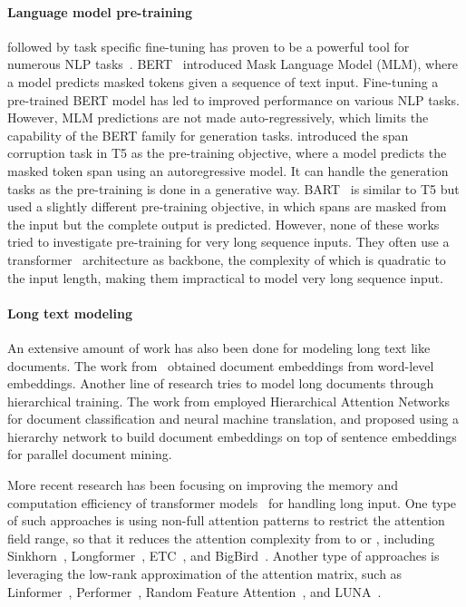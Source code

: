\documentclass[11pt]{article}
\begin{document}
\paragraph{Language model pre-training} 
followed by task specific fine-tuning has proven to be a powerful tool for numerous NLP tasks~\cite{devlin-etal-2019-bert,liu2019roberta,zhang-etal-2019-ernie,Radford2019LanguageMA,t5,lewis-etal-2020-bart,joshi-etal-2020-spanbert}.
BERT~\cite{devlin-etal-2019-bert} introduced Mask Language Model (MLM), where a model predicts masked tokens given a sequence of text input. Fine-tuning a pre-trained BERT model has led to improved performance on various NLP tasks.
However, MLM predictions are not made auto-regressively, which limits the capability of the BERT family for generation tasks.
\citet{t5} introduced the span corruption task in T5 as the pre-training objective, where a model predicts the masked token span using an autoregressive model.
It can handle the generation tasks as the pre-training is done in a generative way.
BART~\cite{lewis-etal-2020-bart} is similar to T5 but used a slightly different pre-training objective, in which spans are masked from the input but the complete output is predicted. 
However, none of these works tried to investigate pre-training for very long sequence inputs.
They often use a transformer~\cite{transformer} architecture as backbone, the complexity of which is quadratic to the input length, making them impractical to model very long sequence input.



\paragraph{Long text modeling}
An extensive amount of work has also been done for modeling long text like documents. The work from~\citet{roy2016,chen2017,wu2018} obtained document embeddings from word-level embeddings. Another line of research tries to model long documents through hierarchical training. The work from \citet{yang-etal-2016-hierarchical,miculicich-etal-2018-document} employed Hierarchical Attention Networks for document classification and neural machine translation, and \citet{guo-etal-2019-hierarchical} proposed using a hierarchy network to build document embeddings on top of sentence embeddings for parallel document mining. 

More recent research has been focusing on improving the memory and computation efficiency of transformer models~\cite{Tay2020EfficientTA,tay2021long} for handling long input. 
One type of such approaches is using non-full attention patterns to restrict the attention field range, so that it reduces the attention complexity from  to  or , including Sinkhorn~\cite{Tay2020SparseSA}, Longformer~\cite{Beltagy2020Longformer}, ETC~\cite{etc}, and BigBird~\cite{bigbird}.
Another type of approaches is leveraging the low-rank approximation of the attention matrix, such as Linformer~\cite{wang2020linformer}, Performer~\cite{choromanski2021rethinking}, Random Feature Attention~\cite{peng2021random}, and LUNA~\cite{ma2021luna}.
\end{document}
